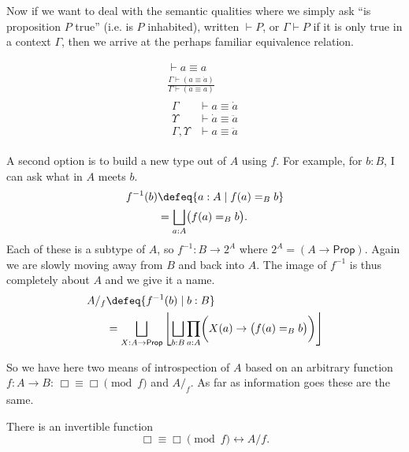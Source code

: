Now if we want to deal with the semantic qualities where we simply 
ask ``is proposition $P$ true'' (i.e. is $P$ inhabited), 
written $\vdash P$, or $\Gamma \vdash P$ if it is only true in a context $\Gamma$,
then we arrive at the perhaps familiar equivalence 
relation.

\begin{corollary}
    \begin{gather}
        \tag{Reflexive} 
        \vdash a\equiv a\\
        \tag{Symmetric}
        \frac{\Gamma \vdash (a\equiv \dot{a})}{\Gamma \vdash (\dot{a}\equiv a)}\\
        \tag{Transitive}
            \begin{array}{rl}
                \Gamma & \vdash a\equiv \dot{a}\\
                \Upsilon &\vdash \dot{a}\equiv \ddot{a}\\
                \hline 
                \Gamma,\Upsilon &\vdash a \equiv \ddot{a}
            \end{array}
    \end{gather}
\end{corollary}

A second option is to build a new type out of $A$ using $f$.
For example, for $b:B$, I can ask what in $A$ meets $b$.
\begin{align*}
    f^{-1}(b) &\defeq \{a:A\mid f(a)=_B b\} \\
    & =
    \bigsqcup_{a:A} \bigl(f(a)=_B b\bigr).
\end{align*}
Each of these is a subtype of $A$, so $f^{-1}:B\to 2^A$
where $2^A=(A\to \mathsf{Prop})$.  Again we are slowly 
moving away from $B$ and back into $A$.  The image of $f^{-1}$
is thus completely about $A$ and we give it a name.
\begin{align*}
    A/_f & \defeq \{ f^{-1}(b)\mid b:B\} \\
    & =
    \bigsqcup_{X:A\to \mathsf{Prop}}\left\lfloor 
        \bigsqcup_{b:B} \prod_{a:A}\biggl(X(a)\rightarrow \bigl(f(a)=_B b\bigr)\biggr)
    \right\rfloor
\end{align*}

So we have here two means of introspection of $A$ based 
on an arbitrary function $f:A\to B$: $\Box \equiv \Box\pmod{f}$
and $A/_f$.  As far as information goes these are the same.

\begin{theorem}
    There is an invertible function 
    \[
        \Box \equiv \Box\pmod{f}\leftrightarrow A/f.
    \]
\end{theorem}



